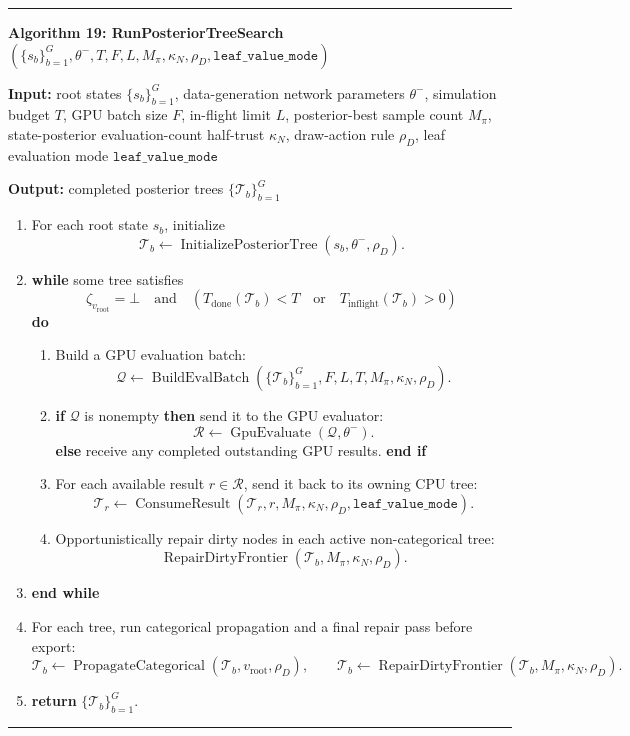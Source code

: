 \documentclass[11pt]{article}
\newcommand{\Tree}{\mathcal{T}}
\newcommand{\ConsumeResult}{\operatorname{ConsumeResult}}
\newcommand{\BuildEvalBatch}{\operatorname{BuildEvalBatch}}
\newcommand{\GpuEvaluate}{\operatorname{GpuEvaluate}}
\newcommand{\RepairDirtyFrontier}{\operatorname{RepairDirtyFrontier}}
\newcommand{\PropagateCategorical}{\operatorname{PropagateCategorical}}
\newenvironment{algorithmblock}[1]
{
  \par\medskip
  \noindent\hrule\par\smallskip
  \noindent\textbf{#1}
  \par\smallskip
}
{
  \par\smallskip\noindent\hrule\par\medskip
}
\newcommand{\Input}{\textbf{Input: }}
\newcommand{\Output}{\textbf{Output: }}
\newcommand{\Return}{\textbf{return }}
\newcommand{\If}{\textbf{if }}
\newcommand{\Then}{\textbf{ then }}
\newcommand{\Else}{\textbf{else }}
\newcommand{\EndIf}{\textbf{end if}}
\newcommand{\While}{\textbf{while }}
\newcommand{\EndWhile}{\textbf{end while}}
\newcommand{\Do}{\textbf{ do }}
\begin{document}
\begin{algorithmblock}{Algorithm 19: RunPosteriorTreeSearch\((\{s_b\}_{b=1}^{G},\theta^-,T,F,L,M_\pi,\kappa_N,\rho_D,\texttt{leaf\_value\_mode})\)}

\Input root states \(\{s_b\}_{b=1}^{G}\), data-generation network parameters \(\theta^-\), simulation budget \(T\), GPU batch size \(F\), in-flight limit \(L\), posterior-best sample count \(M_\pi\), state-posterior evaluation-count half-trust \(\kappa_N\), draw-action rule \(\rho_D\), leaf evaluation mode \(\texttt{leaf\_value\_mode}\)

\Output completed posterior trees \(\{\Tree_b\}_{b=1}^{G}\)

\begin{enumerate}[leftmargin=2em]
  \item For each root state \(s_b\), initialize
  \[
  \Tree_b
  \gets
  \operatorname{InitializePosteriorTree}(s_b,\theta^-,\rho_D).
  \]

  \item \While some tree satisfies
  \[
  \zeta_{v_{\mathrm{root}}}=\bot
  \quad\text{and}\quad
  \left(
  T_{\mathrm{done}}(\Tree_b)<T
  \quad\text{or}\quad
  T_{\mathrm{inflight}}(\Tree_b)>0
  \right)
  \]
  \Do

  \begin{enumerate}[leftmargin=2em]
    \item Build a GPU evaluation batch:
    \[
    \mathcal{Q}
    \gets
    \BuildEvalBatch
    \left(
    \{\Tree_b\}_{b=1}^{G},
    F,
    L,
    T,
    M_\pi,
    \kappa_N,
    \rho_D
    \right).
    \]

    \item \If \(\mathcal{Q}\) is nonempty \Then send it to the GPU evaluator:
    \[
    \mathcal{R}
    \gets
    \GpuEvaluate(\mathcal{Q},\theta^-).
    \]
    \Else receive any completed outstanding GPU results. \EndIf

    \item For each available result \(r\in\mathcal{R}\), send it back to its
    owning CPU tree:
    \[
    \Tree_r
    \gets
    \ConsumeResult(\Tree_r,r,M_\pi,\kappa_N,\rho_D,\texttt{leaf\_value\_mode}).
    \]

    \item Opportunistically repair dirty nodes in each active non-categorical
    tree:
    \[
    \RepairDirtyFrontier(\Tree_b,M_\pi,\kappa_N,\rho_D).
    \]
  \end{enumerate}

  \item \EndWhile

  \item For each tree, run categorical propagation and a final repair pass before
  export:
  \[
  \Tree_b\gets\PropagateCategorical(\Tree_b,v_{\mathrm{root}},\rho_D),
  \qquad
  \Tree_b\gets\RepairDirtyFrontier(\Tree_b,M_\pi,\kappa_N,\rho_D).
  \]

  \item \Return \(\{\Tree_b\}_{b=1}^{G}\).
\end{enumerate}

\end{algorithmblock}
\end{document}
